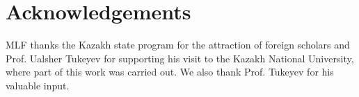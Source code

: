 \documentclass[11pt]{article}
\begin{document}
\section*{Acknowledgements}

MLF thanks the Kazakh state program for the attraction of foreign scholars and Prof. Ualsher Tukeyev for supporting his visit to the Kazakh National University, where part of this work was carried out. We also thank Prof. Tukeyev for his valuable input.



\end{document}

